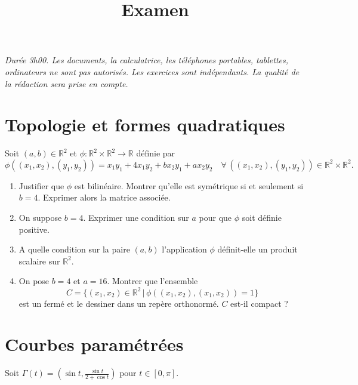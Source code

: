 \documentclass[a4paper]{tp_um}
\title{\large \sffamily\bfseries Examen}
\begin{document}
\maketitle
\textit{Durée 3h00. Les documents, la calculatrice, les téléphones portables, tablettes, ordinateurs ne sont pas autorisés. Les exercices sont indépendants. La qualité de la rédaction sera prise en compte.} 

\bigskip
\bigskip


\section{Topologie et formes quadratiques}

\exo{} Soit $(a,b) \in \mathbb R^2$ et $\phi : \mathbb R^2 \times \mathbb R^2 \to \mathbb R$
d\'efinie par
\[
\phi((x_1,x_2), (y_1,y_2)) = x_1y_1 + 4x_1y_2 + b x_2y_1 + a x_2y_2 \quad 
\forall \, ((x_1,x_2),(y_1,y_2)) \in \mathbb R^2 \times \mathbb R^2.
\]
\begin{enumerate}
\item Justifier que $\phi$ est bilin\'eaire. Montrer qu'elle est sym\'etrique si et seulement si $b=4.$
Exprimer alors la matrice associ\'ee. 
\item On suppose $b=4.$ Exprimer une condition sur $a$ pour que $\phi$ soit d\'efinie positive.
\item A quelle condition sur la paire $(a,b)$  l'application $\phi$ d\'efinit-elle un produit scalaire sur $\mathbb R^2.$
\item On pose $b=4$ et $a=16.$ Montrer que l'ensemble 
    \[
        C =\{(x_1,x_2) \in \mathbb R^2 \, | \, \phi((x_1,x_2),(x_1,x_2)) = 1\}
    \]
est un ferm\'e et le dessiner dans un rep\`ere orthonorm\'e. $C$ est-il compact ? 
\end{enumerate}

\section{Courbes paramétrées}

\exo{} Soit $\Gamma(t) = (\sin t, \frac{\sin t}{2 + \cos t})$ pour $t\in \left[0, \pi  \right]$. 
\end{document}
